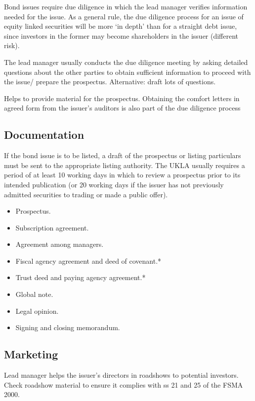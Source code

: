 \documentclass[
]{article}
\providecommand{\tightlist}{%
  \setlength{\itemsep}{0pt}\setlength{\parskip}{0pt}}
\begin{document}
Bond issues require due diligence in which the lead manager verifies
information needed for the issue. As a general rule, the due diligence
process for an issue of equity linked securities will be more `in depth'
than for a straight debt issue, since investors in the former may become
shareholders in the issuer (different risk).

The lead manager usually conducts the due diligence meeting by asking
detailed questions about the other parties to obtain sufficient
information to proceed with the issue/ prepare the prospectus.
Alternative: draft lots of questions.

Helps to provide material for the prospectus. Obtaining the comfort
letters in agreed form from the issuer's auditors is also part of the
due diligence process

\hypertarget{documentation}{%
\subsection{Documentation}\label{documentation}}

If the bond issue is to be listed, a draft of the prospectus or listing
particulars must be sent to the appropriate listing authority. The UKLA
usually requires a period of at least 10 working days in which to review
a prospectus prior to its intended publication (or 20 working days if
the issuer has not previously admitted securities to trading or made a
public offer).

\begin{itemize}
\tightlist
\item
  Prospectus.
\item
  Subscription agreement.
\item
  Agreement among managers.
\item
  Fiscal agency agreement and deed of covenant.*
\item
  Trust deed and paying agency agreement.*
\item
  Global note.
\item
  Legal opinion.
\item
  Signing and closing memorandum.
\end{itemize}

\hypertarget{marketing}{%
\subsection{Marketing}\label{marketing}}

Lead manager helps the issuer's directors in roadshows to potential
investors. Check roadshow material to ensure it complies with ss 21 and
25 of the FSMA 2000.
\end{document}
